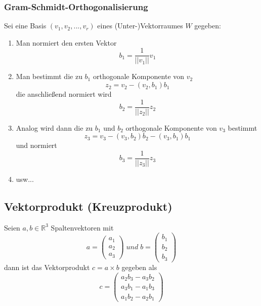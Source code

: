 \documentclass[a4paper,twocolumn,10pt]{article}
\begin{document}
\subsubsection{Gram-Schmidt-Orthogonalisierung}
Sei eine Basis $(v_1,v_2,...,v_r)$ eines (Unter-)Vektorraumes $W$ gegeben:
\begin{enumerate}
\item Man normiert den ersten Vektor
\begin{equation*}
b_1=\frac{1}{||v_1||}v_1
\end{equation*}
\item Man bestimmt die zu $b_1$ orthogonale Komponente von $v_2$
\begin{equation*}
z_2=v_2-(v_2,b_1)b_1
\end{equation*}
die anschließend normiert wird
\begin{equation*}
b_2=\frac{1}{||z_2||}z_2
\end{equation*}
\item Analog wird dann die zu $b_1$ und $b_2$ orthogonale Komponente von $v_3$ bestimmt
\begin{equation*}
z_3=v_3-(v_3,b_2)b_2-(v_3,b_1)b_1
\end{equation*}
und normiert
\begin{equation*}
b_3=\frac{1}{||z_3||}z_3
\end{equation*}
\item usw...
\end{enumerate}

\subsection{Vektorprodukt (Kreuzprodukt)}
Seien $a,b\in\mathbb{R}^3$ Spaltenvektoren mit
\begin{equation*}
a=\begin{pmatrix}a_1 \\ a_2 \\ a_3\end{pmatrix}\;und\;b=\begin{pmatrix}b_1 \\ b_2 \\ b_3\end{pmatrix}
\end{equation*}
dann ist das Vektorprodukt $c=a\times b$ gegeben als
\begin{equation*}
c=\begin{pmatrix}a_2b_3-a_3b_2 \\ a_3b_1-a_1b_3 \\ a_1b_2-a_2b_1\end{pmatrix}
\end{equation*}
\end{document}
